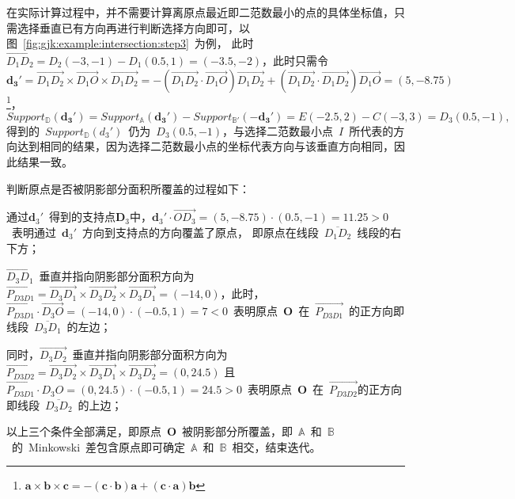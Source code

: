 在实际计算过程中，并不需要计算离原点最近即二范数最小的点的具体坐标值，只需选择垂直已有方向再进行判断选择方向即可，以图~\ref{fig:gjk:example:intersection:step3}~为例，
此时~$\overrightarrow{D_1D_2} = D_2(-3, -1) - D_1(0.5, 1) = (-3.5, -2)$，此时只需令~
$\bm{d_3'} = \overrightarrow{D_1D_2} \times \overrightarrow{D_1O} \times \overrightarrow{D_1D_2} = -(\overrightarrow{D_1D_2} \cdot \overrightarrow{D_1O})\overrightarrow{D_1D_2} +
(\overrightarrow{D_1D_2} \cdot \overrightarrow{D_1D_2})\overrightarrow{D_1O} = (5,-8.75)$
\footnote{$\bm{a} \times \bm{b} \times \bm{c} = -(\bm{c}\cdot\bm{b})\bm{a}+(\bm{c}\cdot\bm{a})\bm{b}$}，
$  Support_\mathbb{D}(\bm{d_3'})  = Support_\mathbb{A}(\bm{d_3'}) - Support_\mathbb{B'}(-\bm{d_3'})  = E(-2.5, 2) - C(-3, 3)  = D_3(0.5, -1),$
得到的~$Support_\mathbb{D}(d_3')$~仍为~$D_3(0.5,-1)$，与选择二范数最小点~$I$~所代表的方向达到相同的结果，因为选择二范数最小点的坐标代表方向与该垂直方向相同，因此结果一致。

判断原点是否被阴影部分面积所覆盖的过程如下：\\ \indent
\begin{inparaenum}[(1)]
  \item 通过$\bm{d}_3'$~得到的支持点$\bm{D}_3$中，$\bm{d}_3' \cdot \overrightarrow{OD_3} = (5, -8.75) \cdot (0.5, -1) = 11.25 > 0$~表明通过~$\bm{d}_3'$~方向到支持点的方向覆盖了原点，
    即原点在线段~$\overline{D_1D_2}$~线段的右下方；\\ \indent
  \item $\overrightarrow{D_3D_1}$~垂直并指向阴影部分面积方向为~$\overrightarrow{P_{D3D1}}=\overrightarrow{D_3D_1} \times \overrightarrow{D_3D_2} \times \overrightarrow{D_3D_1} = (-14, 0)$，此时，
    $\overrightarrow{P_{D3D1}} \cdot \overrightarrow{D_3O} = (-14, 0) \cdot (-0.5, 1) = 7 < 0$~表明原点~$\bm{O}$~在~$\overrightarrow{P_{D3D1}}$~的正方向即线段~$\overline{D_3D_1}$~的左边；\\ \indent
  \item 同时，$\overrightarrow{D_3D_2}$~垂直并指向阴影部分面积方向为~$\overrightarrow{P_{D3D2}}=\overrightarrow{D_3D_2}
\times \overrightarrow{D_3D_1} \times \overrightarrow{D_3D_2} = (0, 24.5)$
且~$\overrightarrow{P_{D3D1}} \cdot D_3O = (0, 24.5) \cdot (-0.5, 1) = 24.5 > 0$~表明原点~$\bm{O}$~在~$\overrightarrow{P_{D3D2}}$的正方向即线段~$\overline{D_3D_2}$~的上边；\\ \indent
\end{inparaenum}
以上三个条件全部满足，即原点~$\bm{O}$~被阴影部分所覆盖，即~$\mathbb{A}$~和~$\mathbb{B}$~的~Minkowski~差包含原点即可确定~$\mathbb{A}$~和~$\mathbb{B}$~相交，结束迭代。

